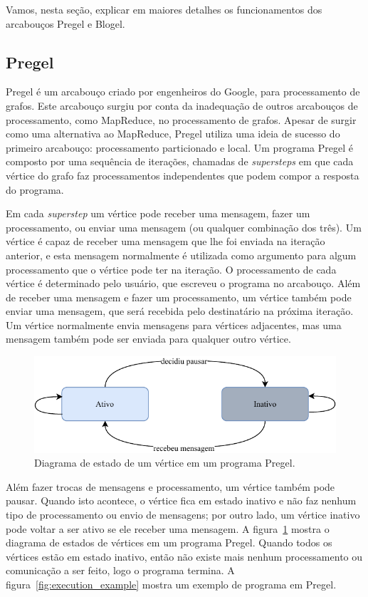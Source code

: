 \documentclass[conference]{IEEEtran}
\begin{document}
Vamos, nesta seção, explicar em maiores detalhes os funcionamentos dos
arcabouços Pregel e Blogel.

\subsection{Pregel}
Pregel é um arcabouço criado por engenheiros do Google, para
processamento de grafos. Este arcabouço surgiu por conta da inadequação
de outros arcabouços de processamento, como MapReduce, no processamento
de grafos. Apesar de surgir como uma alternativa ao MapReduce, Pregel
utiliza uma ideia de sucesso do primeiro arcabouço: processamento
particionado e local. Um programa Pregel é composto por uma sequência
de iterações, chamadas de {\em supersteps} em que cada vértice do grafo
faz processamentos independentes que podem compor a resposta do
programa.

Em cada {\em superstep} um vértice pode receber uma mensagem, fazer um
processamento, ou enviar uma mensagem (ou qualquer combinação dos três).
Um vértice é capaz de receber uma mensagem que lhe foi enviada na
iteração anterior, e esta mensagem normalmente é utilizada como
argumento para algum processamento que o vértice pode ter na iteração. O
processamento de cada vértice é determinado pelo usuário, que escreveu o
programa no arcabouço. Além de receber uma mensagem e fazer um
processamento, um vértice também pode enviar uma mensagem, que será
recebida pelo destinatário na próxima iteração. Um vértice normalmente
envia mensagens para vértices adjacentes, mas uma mensagem também pode
ser enviada para qualquer outro vértice.

\begin{figure}
    \begin{center}
        \includegraphics[width=.45\textwidth]{pregel/vertex_state.pdf}
    \end{center}
    \caption{Diagrama de estado de um vértice em um programa Pregel.}
    \label{fig:pregel_states}
\end{figure}

Além fazer trocas de mensagens e processamento, um vértice também pode
pausar. Quando isto acontece, o vértice fica em estado inativo e não faz
nenhum tipo de processamento ou envio de mensagens; por outro lado, um
vértice inativo pode voltar a ser ativo se ele receber uma mensagem. A
figura~\ref{fig:pregel_states} mostra o diagrama de estados de vértices
em um programa Pregel.  Quando todos os vértices estão em estado
inativo, então não existe mais nenhum processamento ou comunicação a ser
feito, logo o programa termina. A figura~\ref{fig:execution_example}
mostra um exemplo de programa em Pregel.
\end{document}
